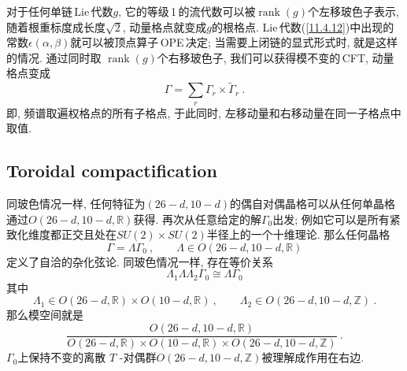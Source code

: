 对于任何单链\,Lie\,代数$ g$, 它的等级\,1\,的流代数可以被$ \operatorname{rank}(g) $个左移玻色子表示, 随着根重标度成长度$ \sqrt{2}$, 动量格点就变成$ g $的根格点. Lie\,代数(\ref{11.4.12})中出现的常数$ \epsilon(\alpha,\beta) $就可以被顶点算子\,OPE\,决定; 当需要上闭链的显式形式时, 就是这样的情况. 通过同时取 $\operatorname{rank}(g) $个右移玻色子, 我们可以获得模不变的\,CFT, 动量格点变成
\begin{equation}
    \Gamma=\sum_{r}\Gamma_{r}\times \tilde{\Gamma}_{r} \:. \label{11.6.10}
\end{equation}
即, 频谱取遍权格点的所有子格点, 于此同时, 左移动量和右移动量在同一子格点中取值.

\subsection*{Toroidal compactification}

同玻色情况一样, 任何特征为$ (26-d,10-d) $的偶自对偶晶格可以从任何单晶格通过$ O(26-d,10-d,\mathds{R}) $获得. 再次从任意给定的解$ \Gamma_{0} $出发; 例如它可以是所有紧致化维度都正交且处在$ SU(2)\times SU(2) $半径上的一个十维理论. 那么任何晶格
\begin{equation}
    \Gamma=\Lambda\Gamma_{0} \:,\qquad \Lambda\in O(26-d,10-d,\mathds{R}) \label{11.6.11}
\end{equation}
定义了自洽的杂化弦论. 同玻色情况一样, 存在等价关系
\begin{equation}
    \Lambda_{1}\Lambda\Lambda_{2}\Gamma_{0} \cong \Lambda\Gamma_{0} \label{11.6.12}
\end{equation}
其中
\begin{equation}
    \Lambda_{1} \in O(26-d,\mathds{R})\times O(10-d,\mathds{R}) \:,\qquad
    \Lambda_{2} \in O(26-d,10-d,\mathds{Z}) \:. \label{11.6.13}
\end{equation}
那么模空间就是
\begin{equation}
    \frac{ O(26-d,10-d,\mathds{R})}{ O(26-d,\mathds{R})\times O(10-d,\mathds{R})\times  O(26-d,10-d,\mathds{Z})}\:.
    \label{11.6.14}
\end{equation}
$\Gamma_{0} $上保持不变的离散 $T$ -对偶群$ O(26-d,10-d,\mathds{Z}) $被理解成作用在右边.

